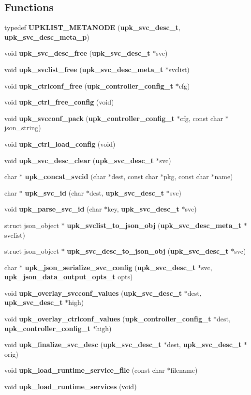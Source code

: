 \subsection*{Functions}
\begin{DoxyCompactItemize}
\item 
typedef {\bf UPKLIST\_\-METANODE} ({\bf upk\_\-svc\_\-desc\_\-t}, {\bf upk\_\-svc\_\-desc\_\-meta\_\-p})
\item 
void {\bf upk\_\-svc\_\-desc\_\-free} ({\bf upk\_\-svc\_\-desc\_\-t} $\ast$svc)
\item 
void {\bf upk\_\-svclist\_\-free} ({\bf upk\_\-svc\_\-desc\_\-meta\_\-t} $\ast$svclist)
\item 
void {\bf upk\_\-ctrlconf\_\-free} ({\bf upk\_\-controller\_\-config\_\-t} $\ast$cfg)
\item 
void {\bf upk\_\-ctrl\_\-free\_\-config} (void)
\item 
void {\bf upk\_\-svcconf\_\-pack} ({\bf upk\_\-controller\_\-config\_\-t} $\ast$cfg, const char $\ast$json\_\-string)
\item 
void {\bf upk\_\-ctrl\_\-load\_\-config} (void)
\item 
void {\bf upk\_\-svc\_\-desc\_\-clear} ({\bf upk\_\-svc\_\-desc\_\-t} $\ast$svc)
\item 
char $\ast$ {\bf upk\_\-concat\_\-svcid} (char $\ast$dest, const char $\ast$pkg, const char $\ast$name)
\item 
char $\ast$ {\bf upk\_\-svc\_\-id} (char $\ast$dest, {\bf upk\_\-svc\_\-desc\_\-t} $\ast$svc)
\item 
void {\bf upk\_\-parse\_\-svc\_\-id} (char $\ast$key, {\bf upk\_\-svc\_\-desc\_\-t} $\ast$svc)
\item 
struct json\_\-object $\ast$ {\bf upk\_\-svclist\_\-to\_\-json\_\-obj} ({\bf upk\_\-svc\_\-desc\_\-meta\_\-t} $\ast$svclist)
\item 
struct json\_\-object $\ast$ {\bf upk\_\-svc\_\-desc\_\-to\_\-json\_\-obj} ({\bf upk\_\-svc\_\-desc\_\-t} $\ast$svc)
\item 
char $\ast$ {\bf upk\_\-json\_\-serialize\_\-svc\_\-config} ({\bf upk\_\-svc\_\-desc\_\-t} $\ast$svc, {\bf upk\_\-json\_\-data\_\-output\_\-opts\_\-t} opts)
\item 
void {\bf upk\_\-overlay\_\-svcconf\_\-values} ({\bf upk\_\-svc\_\-desc\_\-t} $\ast$dest, {\bf upk\_\-svc\_\-desc\_\-t} $\ast$high)
\item 
void {\bf upk\_\-overlay\_\-ctrlconf\_\-values} ({\bf upk\_\-controller\_\-config\_\-t} $\ast$dest, {\bf upk\_\-controller\_\-config\_\-t} $\ast$high)
\item 
void {\bf upk\_\-finalize\_\-svc\_\-desc} ({\bf upk\_\-svc\_\-desc\_\-t} $\ast$dest, {\bf upk\_\-svc\_\-desc\_\-t} $\ast$orig)
\item 
void {\bf upk\_\-load\_\-runtime\_\-service\_\-file} (const char $\ast$filename)
\item 
void {\bf upk\_\-load\_\-runtime\_\-services} (void)
\end{DoxyCompactItemize}
